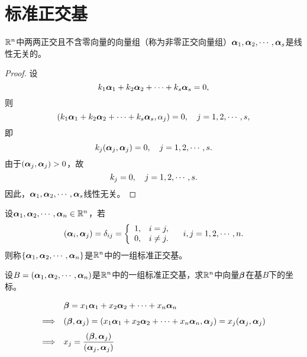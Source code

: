 \section{标准正交基}

\begin{frame}\ft{\secname}

\begin{dingli}
  $\mathbb R^n$中两两正交且不含零向量的向量组（称为非零正交向量组）$\boldsymbol{\alpha}_1,\boldsymbol{\alpha}_2,\cdots,\boldsymbol{\alpha}_s$是线性无关的。
\end{dingli} \pause 
\begin{proof}
设
$$
k_1\boldsymbol{\alpha}_1+k_2\boldsymbol{\alpha}_2+\cdots+k_s\boldsymbol{\alpha}_s=0,
$$
则
$$
(k_1\boldsymbol{\alpha}_1+k_2\boldsymbol{\alpha}_2+\cdots+k_s\boldsymbol{\alpha}_s,\alpha_j)=0, \quad j=1,2,\cdots,s,
$$
即
$$
k_j(\boldsymbol{\alpha}_j,\boldsymbol{\alpha}_j)=0, \quad j=1,2,\cdots,s.
$$
由于$(\boldsymbol{\alpha}_j,\boldsymbol{\alpha}_j)>0$，故
$$
k_j=0, \quad j=1,2,\cdots,s.
$$
因此，$\boldsymbol{\alpha}_1,\boldsymbol{\alpha}_2,\cdots,\boldsymbol{\alpha}_s$线性无关。
\end{proof}
\end{frame}

\begin{frame}\ft{\secname}

\begin{dingyi}[标准正交基]
  设$\boldsymbol{\alpha}_1,\boldsymbol{\alpha}_2,\cdots,\boldsymbol{\alpha}_n\in \mathbb R^n$，若
  $$
  (\boldsymbol{\alpha}_i,\boldsymbol{\alpha}_j)=\delta_{ij}=\left\{
    \begin{array}{ll}
      1,& i=j,\\
      0,& i\ne j.
    \end{array}
  \right. \quad i,j=1,2,\cdots,n.
  $$
  则称$\{\boldsymbol{\alpha}_1,\boldsymbol{\alpha}_2,\cdots,\boldsymbol{\alpha}_n\}$是$\mathbb R^n$中的一组标准正交基。
\end{dingyi}

\end{frame}

\begin{frame}\ft{\secname}

\begin{li}
  设$B=(\boldsymbol{\alpha}_1,\boldsymbol{\alpha}_2,\cdots,\boldsymbol{\alpha}_n)$是$\mathbb R^n$中的一组标准正交基，求$\mathbb R^n$中向量$\boldsymbol{\beta}$在基$B$下的坐标。
\end{li}
\begin{jie}
$$
\begin{array}{rl}
  & \boldsymbol{\beta}=x_1\boldsymbol{\alpha}_1+x_2\boldsymbol{\alpha}_2+\cdots+x_n\boldsymbol{\alpha}_n\\[0.1in]
  \Longrightarrow&   (\boldsymbol{\beta},\boldsymbol{\alpha}_j)=(x_1\boldsymbol{\alpha}_1+x_2\boldsymbol{\alpha}_2+\cdots+x_n\boldsymbol{\alpha}_n,\boldsymbol{\alpha}_j)=x_j(\boldsymbol{\alpha}_j,\boldsymbol{\alpha}_j)\\[0.1in]
  \Longrightarrow& \displaystyle x_j =\frac{ (\boldsymbol{\beta},\boldsymbol{\alpha}_j)}{(\boldsymbol{\alpha}_j,\boldsymbol{\alpha}_j)}
\end{array}
$$
\end{jie}

\end{frame}